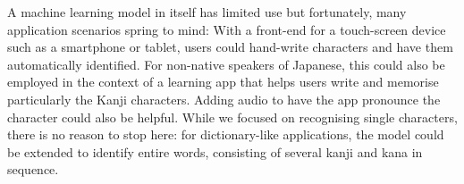 \documentclass[british,12p]{article}
\begin{document}
    A machine learning model in itself has limited use but fortunately, many application scenarios spring to mind:
    With a front-end for a touch-screen device such as a smartphone or tablet, users could hand-write characters and have them automatically identified.  For non-native speakers of Japanese, this could also be employed in the context of a learning app that helps users write and memorise particularly the Kanji characters. Adding audio to have the app pronounce the character could also be helpful. While we focused on recognising single characters, there is no reason to stop here: for dictionary-like applications, the model could be extended to identify entire words, consisting of several kanji and kana in sequence. 
           
            
      \printbibliography
    
\end{document}
